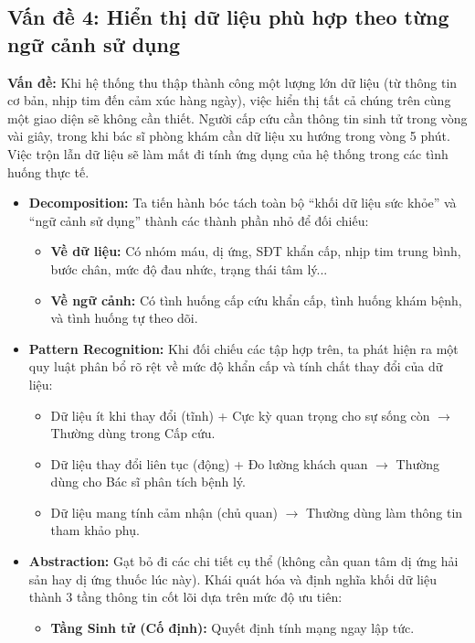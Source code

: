 \documentclass[a4paper,12pt]{article}
\begin{document}
\subsection{Vấn đề 4: Hiển thị dữ liệu phù hợp theo từng ngữ cảnh sử dụng}

\textbf{Vấn đề:} Khi hệ thống thu thập thành công một lượng lớn dữ liệu (từ thông tin cơ bản, nhịp tim đến cảm xúc hàng ngày), việc hiển thị tất cả chúng trên cùng một giao diện sẽ không cần thiết. Người cấp cứu cần thông tin sinh tử trong vòng vài giây, trong khi bác sĩ phòng khám cần dữ liệu xu hướng trong vòng 5 phút. Việc trộn lẫn dữ liệu sẽ làm mất đi tính ứng dụng của hệ thống trong các tình huống thực tế.

\begin{itemize}
    \item \textbf{Decomposition:} Ta tiến hành bóc tách toàn bộ ``khối dữ liệu sức khỏe'' và ``ngữ cảnh sử dụng'' thành các thành phần nhỏ để đối chiếu:
    \begin{itemize}
        \item \textbf{Về dữ liệu:} Có nhóm máu, dị ứng, SĐT khẩn cấp, nhịp tim trung bình, bước chân, mức độ đau nhức, trạng thái tâm lý...
        \item \textbf{Về ngữ cảnh:} Có tình huống cấp cứu khẩn cấp, tình huống khám bệnh, và tình huống tự theo dõi.
    \end{itemize}
    \item \textbf{Pattern Recognition:} Khi đối chiếu các tập hợp trên, ta phát hiện ra một quy luật phân bổ rõ rệt về mức độ khẩn cấp và tính chất thay đổi của dữ liệu:
    \begin{itemize}
        \item Dữ liệu ít khi thay đổi (tĩnh) + Cực kỳ quan trọng cho sự sống còn $\rightarrow$ Thường dùng trong Cấp cứu.
        \item Dữ liệu thay đổi liên tục (động) + Đo lường khách quan $\rightarrow$ Thường dùng cho Bác sĩ phân tích bệnh lý.
        \item Dữ liệu mang tính cảm nhận (chủ quan) $\rightarrow$ Thường dùng làm thông tin tham khảo phụ.
    \end{itemize}
    \item \textbf{Abstraction:} Gạt bỏ đi các chi tiết cụ thể (không cần quan tâm dị ứng hải sản hay dị ứng thuốc lúc này). Khái quát hóa và định nghĩa khối dữ liệu thành 3 tầng thông tin cốt lõi dựa trên mức độ ưu tiên:
    \begin{itemize}
        \item \textbf{Tầng Sinh tử (Cố định):} Quyết định tính mạng ngay lập tức.

\end{itemize}
\end{itemize}
\end{document}
